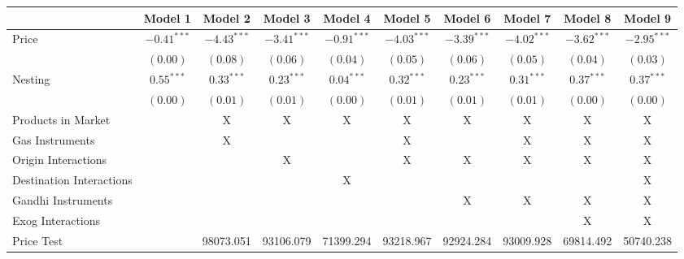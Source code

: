 
\begin{tabular}{l c c c c c c c c c}
\toprule
 & Model 1 & Model 2 & Model 3 & Model 4 & Model 5 & Model 6 & Model 7 & Model 8 & Model 9 \\
\midrule
Price                       & $-0.41^{***}$ & $-4.43^{***}$ & $-3.41^{***}$ & $-0.91^{***}$ & $-4.03^{***}$ & $-3.39^{***}$ & $-4.02^{***}$ & $-3.62^{***}$ & $-2.95^{***}$ \\
                            & $(0.00)$      & $(0.08)$      & $(0.06)$      & $(0.04)$      & $(0.05)$      & $(0.06)$      & $(0.05)$      & $(0.04)$      & $(0.03)$      \\
Nesting                     & $0.55^{***}$  & $0.33^{***}$  & $0.23^{***}$  & $0.04^{***}$  & $0.32^{***}$  & $0.23^{***}$  & $0.31^{***}$  & $0.37^{***}$  & $0.37^{***}$  \\
                            & $(0.00)$      & $(0.01)$      & $(0.01)$      & $(0.00)$      & $(0.01)$      & $(0.01)$      & $(0.01)$      & $(0.00)$      & $(0.00)$      \\
\midrule
Products in Market          &               & X             & X             & X             & X             & X             & X             & X             & X             \\
Gas Instruments             &               & X             &               &               & X             &               & X             & X             & X             \\
Origin Interactions         &               &               & X             &               & X             & X             & X             & X             & X             \\
Destination Interactions    &               &               &               & X             &               &               &               &               & X             \\
Gandhi Instruments          &               &               &               &               &               & X             & X             & X             & X             \\
Exog Interactions           &               &               &               &               &               &               &               & X             & X             \\
Price Test                  &               & 98073.051     & 93106.079     & 71399.294     & 93218.967     & 92924.284     & 93009.928     & 69814.492     & 50740.238     \\

\end{tabular}
